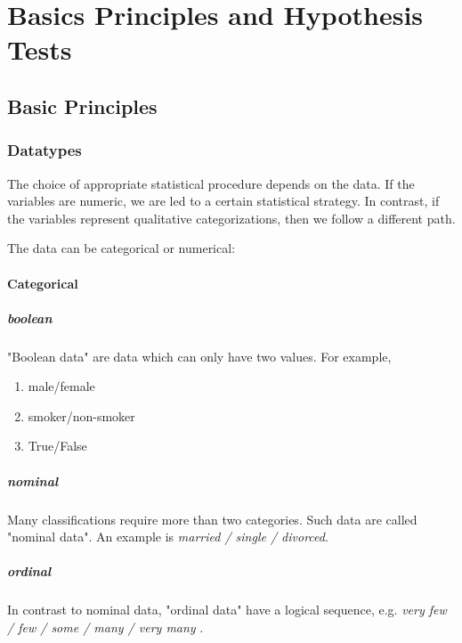 \part{Basics Principles and Hypothesis Tests}

\chapter{Basic Principles}

\section{Datatypes}

The choice of appropriate statistical procedure depends on the data. If the variables are numeric, we are led to a certain statistical strategy. In contrast, if the variables represent qualitative categorizations, then we follow a different path.

 The data can be \gls{categorical} or \gls{numerical}:

\subsection{Categorical} 

\subsubsection{boolean}

"Boolean data" are data which can only have two values. For example,
\begin{enumerate}
  \item male/female
  \item smoker/non-smoker
  \item True/False
\end{enumerate}

\subsubsection{nominal}
Many classifications require more than two categories. Such data are called "nominal data". An example is  \emph{married / single / divorced}.

\subsubsection{ordinal}
In contrast to nominal data, "ordinal data" have a logical sequence, e.g. \emph{very few / few / some / many / very many} .

